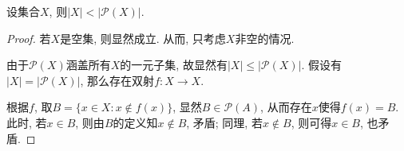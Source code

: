 \begin{theorem}{}
	设集合$X$, 则$|X|< |\mathcal{P}(X)|$.
\end{theorem}
\begin{proof}
	若$X$是空集, 则显然成立. 从而, 只考虑$X$非空的情况. 
	
	由于$\mathcal{P}(X)$涵盖所有$X$的一元子集, 故显然有$|X| \leq |\mathcal{P}(X)|$. 假设有$|X| = | \mathcal{P}(X)|$, 那么存在双射$f: X \to X$. 
	
	根据$f$, 取$B=\{ x \in X: x \notin f(x) \}$, 显然$B \in \mathcal{P}(A)$, 从而存在$x$使得$f(x)=B$. 此时, 若$x \in B$, 则由$B$的定义知$x \notin B$, 矛盾; 同理, 若$x \notin B$, 则可得$x \in B$, 也矛盾. 
\end{proof}


